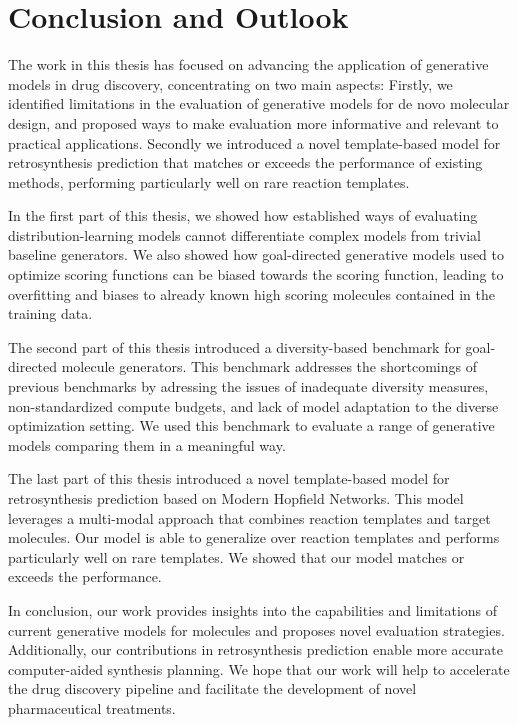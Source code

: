 \chapter{Conclusion and Outlook\label{chap:conclusion}}
The work in this thesis has focused on
advancing the application of generative models in drug discovery, concentrating on two main aspects:
Firstly, we identified limitations in the evaluation of generative models for de novo molecular
design, and proposed ways to make evaluation more informative and relevant to practical
applications. Secondly we introduced a novel template-based model for retrosynthesis prediction
that matches or exceeds the performance of existing methods, performing particularly well on rare
reaction templates.

In the first part of this thesis, we showed how established ways of evaluating distribution-learning
models cannot differentiate complex models from trivial baseline generators. We also showed
how goal-directed generative models used to optimize scoring functions can be biased towards the
scoring function, leading to overfitting and biases to already known high scoring molecules contained
in the training data.

The second part of this thesis introduced a diversity-based benchmark for goal-directed molecule
generators. This benchmark addresses the shortcomings of previous benchmarks by adressing the issues
of inadequate diversity measures, non-standardized compute budgets, and lack of model adaptation to
the diverse optimization setting. We used this benchmark to evaluate a range of generative models
comparing them in a meaningful way.

The last part of this thesis introduced a novel template-based model for retrosynthesis prediction
based on Modern Hopfield Networks. This model leverages a
multi-modal approach that combines reaction templates and target molecules. Our model is able to
generalize over reaction templates and performs particularly well on rare templates. We showed that
our model matches or exceeds the performance.

In conclusion, our work provides insights into the capabilities and limitations of current generative
models for molecules and proposes novel evaluation strategies. Additionally, our contributions in
retrosynthesis prediction enable more accurate computer-aided synthesis planning.
We hope that our work will help to accelerate the drug discovery pipeline and facilitate the development
of novel pharmaceutical treatments.
